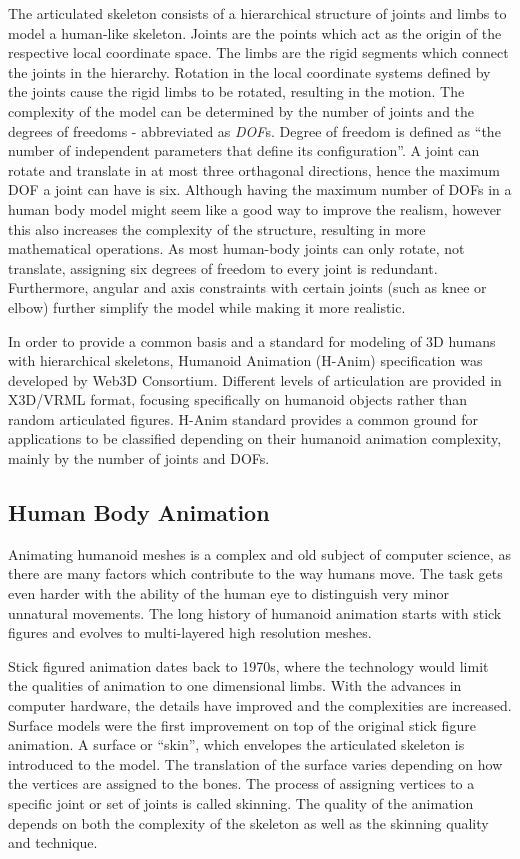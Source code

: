 The articulated skeleton consists of a hierarchical structure of joints and limbs to model a human-like skeleton. Joints are the points which act as the origin of the respective 
local coordinate space. The limbs are the rigid segments which connect the joints in the hierarchy. Rotation in the local coordinate systems defined by the joints cause the rigid
limbs to be rotated, resulting in the motion. The complexity of the model can be determined by the number of joints and the degrees of freedoms - abbreviated as \textit{DOF}s.
Degree of freedom is defined as ``the number of independent parameters that define its configuration''\cite{Lazard2013}. A joint can rotate and translate in at most three orthagonal
directions, hence the maximum DOF a joint can have is six. Although having the maximum number of DOFs in a human body model might seem like a good way to improve the realism, 
however this also increases the complexity of the structure, resulting in more mathematical operations. As most human-body joints can only rotate, not translate, assigning six 
degrees of freedom to every joint is redundant. Furthermore, angular and axis constraints with certain joints (such as knee or elbow) further simplify the model while making it 
more realistic. 

In order to provide a common basis and a standard for modeling of 3D humans with hierarchical skeletons, Humanoid Animation (H-Anim) specification was developed by 
Web3D Consortium\cite{HANIM}. Different levels of articulation are provided in X3D/VRML format, focusing specifically on humanoid objects rather than random 
articulated figures. H-Anim standard provides a common ground for applications to be classified depending on their humanoid animation complexity, mainly by the 
number of joints and DOFs. 

\subsection{Human Body Animation}
\label{section_related_human_body_animation}

Animating humanoid meshes is a complex and old subject of computer science, as there are many factors which contribute to the way humans move. The task gets 
even harder with the ability of the human eye to distinguish very minor unnatural movements. The long history of humanoid animation starts with stick figures 
and evolves to multi-layered high resolution meshes. 

Stick figured animation dates back to 1970s, where the technology would limit the qualities of animation to one dimensional limbs\cite{Badler1979}.
With the advances in computer hardware, the details have improved and the complexities are increased. Surface models were the first improvement on top 
of the original stick figure animation. A surface or ``skin'', which envelopes the articulated skeleton is 
introduced to the model. The translation of the surface varies depending on how the vertices are assigned to the bones. The process of assigning vertices to 
a specific joint or set of joints is called skinning. The quality of the animation depends on both the complexity of the skeleton as well as the skinning 
quality and technique. 

